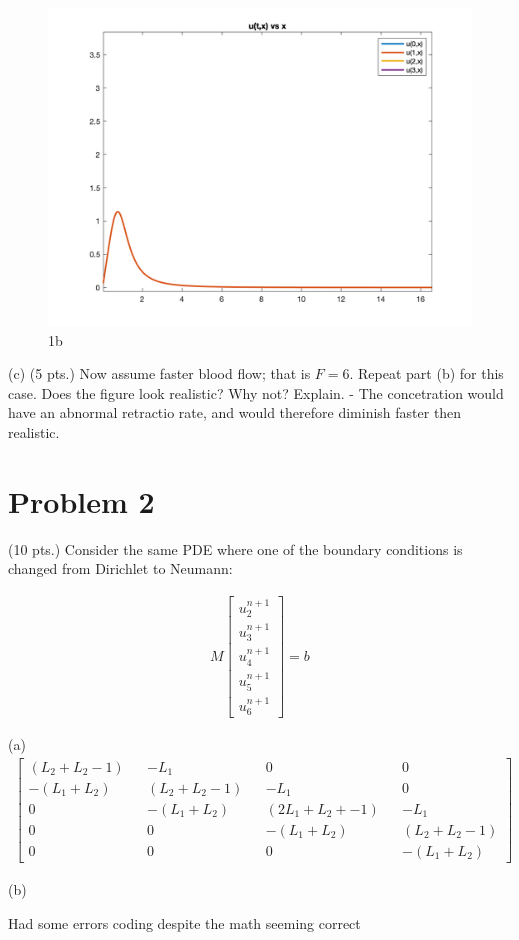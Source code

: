 \documentclass{article}
\begin{document}
\begin{figure}[H]
  \includegraphics[width=\linewidth]{docs/1b.png}
  \caption{1b}
\end{figure}

(c) (5 pts.) Now assume faster blood flow; that is $F = 6$. Repeat part (b) for this case. Does the figure look realistic? Why not? Explain.
- The concetration would have an abnormal retractio rate, and would therefore diminish faster then realistic.

\section*{Problem 2} %
(10 pts.) Consider the same PDE where one of the boundary conditions is changed from Dirichlet to Neumann:

\begin{align*}
M\begin{bmatrix}u^{n+1}_{2}\\u^{n+1}_{3}\\u^{n+1}_{4}\\u^{n+1}_{5}\\u^{n+1}_{6}\end{bmatrix} = b
\end{align*}


(a)
\begin{align*}
\begin{bmatrix} (L_{2} + L_{2} - 1) && -L_{1} && 0 && 0\\ -(L_{1} + L_{2}) && (L_{2} + L_{2} - 1) && -L_{1} && 0\\ 0 &&  -(L_{1}+ L_{2}) && (2L_{1} + L_{2} + -1) && -L_{1} \\0 && 0 && -(L_{1} + L_{2}) && (L_{2} + L_{2} - 1) \\0 && 0 && 0 &&-(L_{1} + L_{2})\end{bmatrix}
\end{align*}

(b)

Had some errors coding despite the math seeming correct
\end{document}
